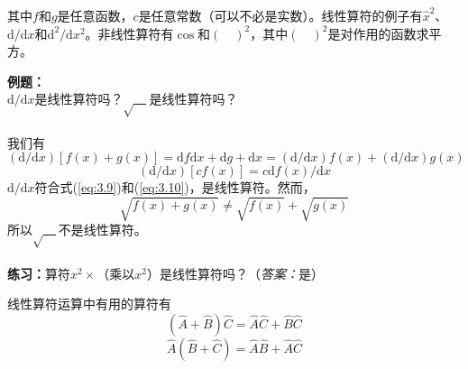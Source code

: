 	其中$f$和$g$是任意函数，$c$是任意常数（可以不必是实数）。线性算符的例子有$\hat{x}^2$、$\mathrm{d}/\mathrm{d}x$和$\mathrm{d}^2/\mathrm{d}x^2$。非线性算符有$\cos$和$\left(\quad\right)^2$，其中$\left(\quad\right)^2$是对作用的函数求平方。\\
	\begin{examplebox}
		\textbf{例题：}\\
		$\mathrm{d}/\mathrm{d}x$是线性算符吗？$\sqrt{\quad}$是线性算符吗？\\
		\\
		\indent 我们有
		\begin{equation*}
			\left(\mathrm{d}/\mathrm{d}x\right) \left[f\left(x\right)+g\left(x\right)\right] = \mathrm{d}f\mathrm{d}x+\mathrm{d}g+\mathrm{d}x=\left(\mathrm{d}/\mathrm{d}x\right)f\left(x\right)+\left(\mathrm{d}/\mathrm{d}x\right)g\left(x\right)
		\end{equation*}
		\begin{equation*}
			\left(\mathrm{d}/\mathrm{d}x\right)\left[cf\left(x\right)\right] = c \mathrm{d}f\left(x\right) /\mathrm{d}x
		\end{equation*}
		$\mathrm{d}/\mathrm{d}x$符合式(\ref{eq:3.9})和(\ref{eq:3.10})，是线性算符。然而，
		\begin{equation*}
			\sqrt{f\left(x\right)+g\left(x\right)} \neq \sqrt{f\left(x\right)} +\sqrt{g\left(x\right)}
		\end{equation*}
		所以$\sqrt{\quad}$不是线性算符。\\
		\\
		\textbf{练习：}算符$x^2\times$（乘以$x^2$）是线性算符吗？（\textit{答案：}是）
	\end{examplebox}
	\indent 线性算符运算中有用的算符有
	\begin{equation}
		\boxed{
			\left(\hat{A}+\hat{B}\right)\hat{C} = \hat{A}\hat{C}+\hat{B}\hat{C}
		}
		\label{eq:3.11}
	\end{equation}
	\begin{equation}
		\boxed{
			\hat{A}\left(\hat{B}+\hat{C}\right) = \hat{A}\hat{B}+\hat{A}\hat{C}
		}
		\label{eq:3.12}
	\end{equation}
